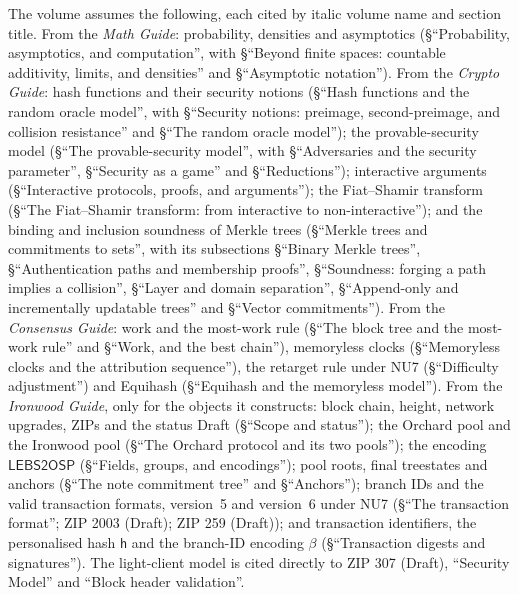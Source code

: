 \documentclass[11pt,a4paper]{article}
\theoremstyle{definition}
\begin{document}
The volume assumes the following, each cited by italic volume name and
section title. From the \emph{Math Guide}: probability, densities and
asymptotics (\S``Probability, asymptotics, and computation'', with
\S``Beyond finite spaces: countable additivity, limits, and densities'' and
\S``Asymptotic notation''). From the \emph{Crypto Guide}: hash functions and
their security notions (\S``Hash functions and the random oracle model'',
with \S``Security notions: preimage, second-preimage, and collision
resistance'' and \S``The random oracle model''); the provable-security
model (\S``The provable-security model'', with \S``Adversaries and the
security parameter'', \S``Security as a game'' and \S``Reductions'');
interactive arguments (\S``Interactive protocols, proofs, and arguments'');
the Fiat--Shamir transform
(\S``The Fiat--Shamir transform: from interactive to non-interactive''); and
the binding and inclusion soundness of Merkle trees (\S``Merkle trees and
commitments to sets'', with its subsections \S``Binary Merkle trees'',
\S``Authentication paths and membership proofs'', \S``Soundness: forging a
path implies a collision'', \S``Layer and domain separation'',
\S``Append-only and incrementally updatable trees'' and \S``Vector
commitments''). From the \emph{Consensus Guide}: work and the most-work rule
(\S``The block tree and the most-work rule'' and \S``Work, and the best
chain''), memoryless clocks (\S``Memoryless clocks and the attribution
sequence''), the retarget rule under NU7 (\S``Difficulty adjustment'') and
Equihash (\S``Equihash and the memoryless model''). From the \emph{Ironwood
Guide}, only for the objects it constructs: block chain, height, network
upgrades, ZIPs and the status Draft (\S``Scope and status''); the Orchard
pool and the Ironwood pool (\S``The Orchard protocol and its two pools''); the
encoding $\mathsf{LEBS2OSP}$ (\S``Fields, groups, and encodings''); pool
roots, final treestates and anchors (\S``The note commitment tree'' and
\S``Anchors''); branch IDs and the valid transaction formats, version~5 and
version~6 under NU7 (\S``The transaction format''; ZIP 2003 (Draft);
ZIP 259 (Draft)); and transaction identifiers, the personalised hash
$\mathsf{h}$ and the branch-ID encoding $\beta$ (\S``Transaction digests and
signatures'').
The light-client model is cited directly to ZIP 307 (Draft), ``Security
Model'' and ``Block header validation''.
\end{document}
